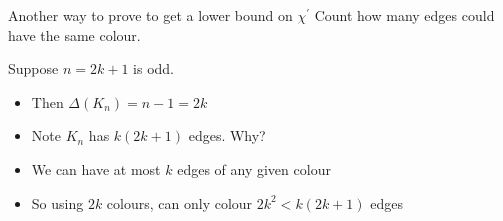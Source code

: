 \documentclass{beamer}
\begin{document}
\begin{frame}{Another way to prove to get a lower bound on $\chi^\prime$}
Count how many edges could have the same colour.

  \begin{example}
    Suppose $n=2k+1$ is odd.
\begin{itemize}
\item Then $\Delta(K_n)=n-1=2k$  
\item Note $K_n$ has $k(2k+1)$ edges.  Why? 
\item We can have at most $k$ edges of any given colour
\item So using $2k$ colours, can only colour $2k^2<k(2k+1)$ edges
\end{itemize}
  


    

\end{example}
\end{frame}
\end{document}
